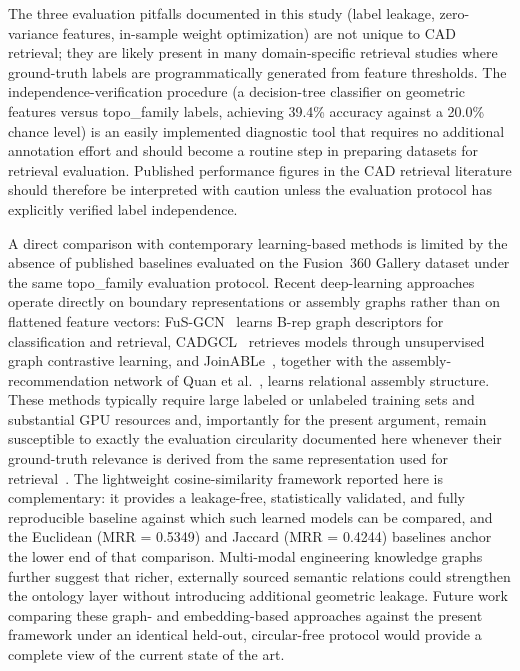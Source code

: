 \documentclass[preprint,12pt]{elsarticle}
\begin{document}
The three evaluation pitfalls documented in this study (label leakage, zero-variance features, in-sample weight optimization) are not unique to CAD retrieval; they are likely present in many domain-specific retrieval studies where ground-truth labels are programmatically generated from feature thresholds.
The independence-verification procedure (a decision-tree classifier on geometric features versus topo\_family labels, achieving 39.4\% accuracy against a 20.0\% chance level) is an easily implemented diagnostic tool that requires no additional annotation effort and should become a routine step in preparing datasets for retrieval evaluation.
Published performance figures in the CAD retrieval literature should therefore be interpreted with caution unless the evaluation protocol has explicitly verified label independence.

A direct comparison with contemporary learning-based methods is limited by the absence of published baselines evaluated on the Fusion~360 Gallery dataset under the same topo\_family evaluation protocol.
Recent deep-learning approaches operate directly on boundary representations or assembly graphs rather than on flattened feature vectors: FuS-GCN~\cite{Hou2023} learns B-rep graph descriptors for classification and retrieval, CADGCL~\cite{Qin2025} retrieves models through unsupervised graph contrastive learning, and JoinABLe~\cite{Willis2022}, together with the assembly-recommendation network of Quan et al.~\cite{Quan2024}, learns relational assembly structure.
These methods typically require large labeled or unlabeled training sets and substantial GPU resources and, importantly for the present argument, remain susceptible to exactly the evaluation circularity documented here whenever their ground-truth relevance is derived from the same representation used for retrieval~\cite{Kapoor2023}.
The lightweight cosine-similarity framework reported here is complementary: it provides a leakage-free, statistically validated, and fully reproducible baseline against which such learned models can be compared, and the Euclidean (MRR = 0.5349) and Jaccard (MRR = 0.4244) baselines anchor the lower end of that comparison.
Multi-modal engineering knowledge graphs~\cite{Pan2024} further suggest that richer, externally sourced semantic relations could strengthen the ontology layer without introducing additional geometric leakage.
Future work comparing these graph- and embedding-based approaches against the present framework under an identical held-out, circular-free protocol would provide a complete view of the current state of the art.
\end{document}

